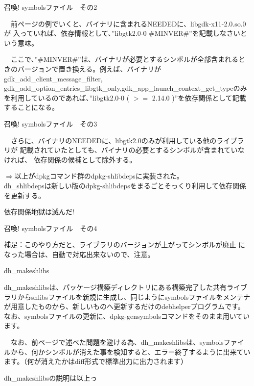 \begin{frame}{召喚! symbolsファイル　その2}

　前ページの例でいくと、バイナリに含まれるNEEDEDに、libgdk-x11-2.0.so.0が
入っていれば、依存情報として、''libgtk2.0-0 \#MINVER\#''を記載しなさいという意味。

　ここで、''\#MINVER\#''は、バイナリが必要とするシンボルが全部含まれるときのバージョンで置き換える。例えば、バイナリが gdk\_add\_client\_message\_filter, gdk\_add\_option\_entries\_libgtk\_only,gdk\_app\_launch\_context\_get\_typeのみを利用しているのであれば、''libgtk2.0-0 ( $>=$ 2.14.0 )''を依存関係として記載することになる。

\end{frame}

\begin{frame}{召喚! symbolsファイル　その3}

　さらに、バイナリのNEEDEDに、libgtk2.0のみが利用している他のライブラリが
記載されていたとしても、バイナリの必要とするシンボルが含まれていなければ、
依存関係の候補として除外する。

 $\Longrightarrow$以上がdpkgコマンド群のdpkg-shlibdepsに実装された。\\
dh\_shlibdepsは新しい版のdpkg-shlibdepsをまるごとそっくり利用して依存関係を更新する。

\begin{center}
\Large
依存関係地獄は滅んだ!
\end{center}

\end{frame}

\begin{frame}{召喚! symbolsファイル　その4}

 補足：このやり方だと、ライブラリのバージョンが上がってシンボルが廃止
になった場合は、自動で対応出来ないので、注意。

\end{frame}

\begin{frame}{dh\_makeshlibs}

 dh\_makeshlibsは、パッケージ構築ディレクトリにある構築完了した共有ライブラリからshlibsファイルを新規に生成し、同じようにsymbolsファイルをメンテナが用意したものから、新しいものへ更新するだけのdebhelperプログラムです。なお、symbolsファイルの更新に、dpkg-gensymbolsコマンドをそのまま用いています。

　なお、前ページで述べた問題を避ける為、dh\_makeshlibsは、symbolsファイルから、何かシンボルが消えた事を検知すると、エラー終了するように出来ています。（何が消えたかはdiff形式で標準出力に出力されます）
 
\begin{center}
\Large
dh\_makeshlibsの説明は以上っ
\end{center}

\end{frame}

